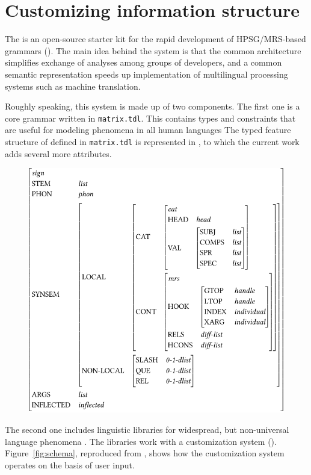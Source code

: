\chapter{Customizing information structure}
\label{chapter11}
\setcounter{enums}{0}


The \lingo {} is an open-source starter kit for the
rapid development of HPSG/MRS-based grammars
(\citealt{bender:etal:10}).  The main idea behind the system is that
the common architecture simplifies exchange of analyses among groups
of developers, and a common semantic representation speeds up
implementation of multilingual processing systems such as machine
translation.



Roughly speaking, this system is made up of two components.  The first
one is a core grammar written in \texttt{matrix.tdl}. This contains
types and constraints that are useful for modeling phenomena in all
human languages The typed feature structure of  defined in
\texttt{matrix.tdl} is represented in , to
which the current work adds several more attributes.

\begin{figure}
\caption{}
\label{avm:sign-matrix}
\includegraphics[width=.9\textwidth]{pdf/sign-matrix.pdf}
\end{figure}



\noindent The second one includes linguistic libraries for widespread,
but non-universal language phenomena
\citep{bender:flickinger:05,drellishak:09}.  The libraries work with a
customization system
().
Figure~\ref{fig:schema}, reproduced from \citet{bender:etal:10}, shows
how the \lingo {} customization system operates on
the basis of user input.



